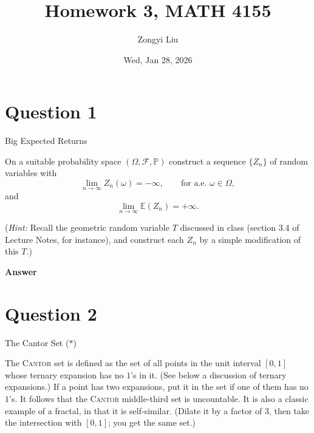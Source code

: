 \documentclass[letterpaper]{article}
\title{Homework 3, MATH 4155}
\author{Zongyi Liu}
\date{Wed, Jan 28, 2026}
\begin{document}
		\maketitle
		
		\section{Question 1}
		
		{\color{deepred} Big Expected Returns} 
		
		On a suitable probability space $(\Omega, \mathcal{F}, \mathbb{P})$ construct a
		sequence $\{Z_n\}$ of random variables with
		\[
		\lim_{n\to\infty} Z_n(\omega) = -\infty,
		\qquad \text{for a.e. } \omega \in \Omega,
		\]
		and
		\[
		\lim_{n\to\infty} \mathbb{E}(Z_n) = +\infty.
		\]
		
		(\textit{Hint:} Recall the geometric random variable $T$ discussed in class
		(section 3.4 of Lecture Notes, for instance), and construct each $Z_n$ by a
		simple modification of this $T$.)
		
		\textbf{Answer}
		
		\clearpage
		
	
	\section{Question 2}
	
	{\color{deepred} The Cantor Set ($\ast$)} 
	
	The \textsc{Cantor} set is defined as the set of all points in the unit interval
	$[0,1]$ whose ternary expansion has no $1$'s in it. (See below a discussion of
	ternary expansions.) If a point has two expansions, put it in the set if one of
	them has no $1$'s. It follows that the \textsc{Cantor} middle-third set is
	uncountable. It is also a classic example of a fractal, in that it is
	self-similar. (Dilate it by a factor of $3$, then take the intersection with
	$[0,1]$; you get the same set.)
	
\end{document}
